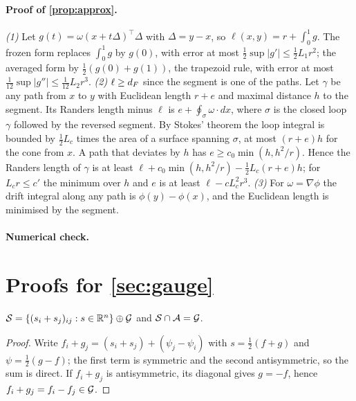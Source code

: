 \paragraph{Proof of \cref{prop:approx}.}
\emph{(1)} Let $g(t)=\omega(x+t\Delta)^\top\Delta$ with $\Delta=y-x$, so
$\ell(x,y)=r+\int_0^1g$. The frozen form replaces $\int_0^1g$ by $g(0)$,
with error at most $\tfrac12\sup|g'|\le\tfrac12L_1r^2$; the averaged form
by $\tfrac12(g(0)+g(1))$, the trapezoid rule, with error at most
$\tfrac1{12}\sup|g''|\le\tfrac1{12}L_2r^3$.
\emph{(2)}  $\ell\ge d_F$ since the segment is one of
the paths. Let $\gamma$ be any path from $x$ to $y$ with Euclidean length
$r+e$ and maximal distance $h$ to the segment. Its Randers length minus
$\ell$ is $e+\oint_\sigma\omega\cdot dx$, where $\sigma$ is the closed
loop $\gamma$ followed by the reversed segment. By Stokes' theorem the
loop integral is bounded by $\tfrac12L_c$ times the area of a surface
spanning $\sigma$, at most $(r+e)h$ for the cone from $x$. A path that
deviates by $h$ has $e\ge c_0\min(h,h^2/r)$. Hence the Randers length of
$\gamma$ is at least $\ell+c_0\min(h,h^2/r)-\tfrac12L_c(r+e)h$; for
$L_cr\le c'$ the minimum over $h$ and $e$ is at least $\ell-cL_c^2r^3$.
\emph{(3)} For $\omega=\nabla\phi$ the drift integral along any path is
$\phi(y)-\phi(x)$, and the Euclidean length is minimised by the segment.

\paragraph{Numerical check.}

\section{Proofs for \cref{sec:gauge}}
\label{app:proofs}

\begin{lemma}
  $\mathcal{S}=\{(s_i+s_j)_{ij}:s\in\mathbb{R}^n\}\oplus\mathcal{G}$ and $\mathcal{S}\cap\mathcal{A}=\mathcal{G}$.
\end{lemma}
\begin{proof}
  Write $f_i+g_j=(s_i+s_j)+(\psi_j-\psi_i)$ with $s=\tfrac12(f+g)$ and
  $\psi=\tfrac12(g-f)$; the first term is symmetric and the second
  antisymmetric, so the sum is direct. If $f_i+g_j$ is antisymmetric, its
  diagonal gives $g=-f$, hence $f_i+g_j=f_i-f_j\in\mathcal{G}$.
\end{proof}

